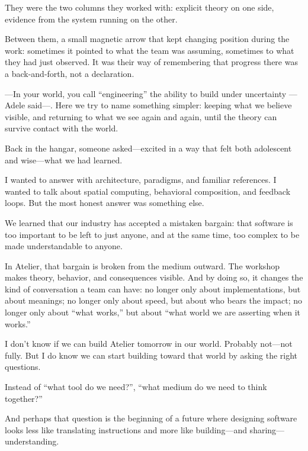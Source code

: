 \documentclass[11pt,a4paper]{article}
\begin{document}
They were the two columns they worked with: explicit theory on one side,
evidence from the system running on the other.

Between them, a small magnetic arrow that kept changing position during the
work: sometimes it pointed to what the team was assuming, sometimes to what
they had just observed. It was their way of remembering that progress there
was a back-and-forth, not a declaration.

---In your world, you call ``engineering'' the ability to build under
uncertainty ---Adele said---. Here we try to name something simpler: keeping
what we believe visible, and returning to what we see again and again, until
the theory can survive contact with the world.

Back in the hangar, someone asked---excited in a way that felt both
adolescent and wise---what we had learned.

I wanted to answer with architecture, paradigms, and familiar references. I
wanted to talk about spatial computing, behavioral composition, and feedback
loops. But the most honest answer was something else.

We learned that our industry has accepted a mistaken bargain: that software
is too important to be left to just anyone, and at the same time, too complex
to be made understandable to anyone.

In Atelier, that bargain is broken from the medium outward. The workshop
makes theory, behavior, and consequences visible. And by doing so, it changes
the kind of conversation a team can have: no longer only about
implementations, but about meanings; no longer only about speed, but about
who bears the impact; no longer only about ``what works,'' but about ``what
world we are asserting when it works.''

I don't know if we can build Atelier tomorrow in our world. Probably not---not
fully. But I do know we can start building toward that world by asking the
right questions.

Instead of ``what tool do we need?'', ``what medium do we need to think
together?''

And perhaps that question is the beginning of a future where designing
software looks less like translating instructions and more like
building---and sharing---understanding.
\end{document}
